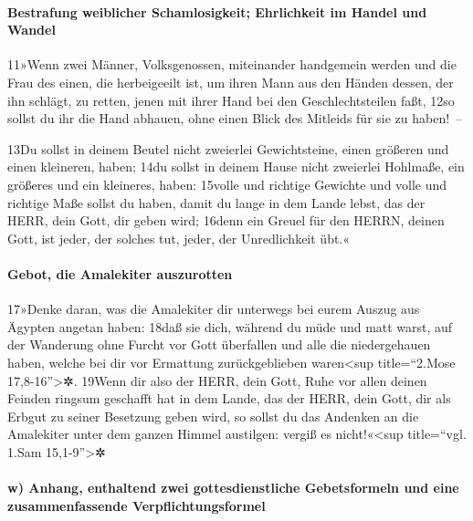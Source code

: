 \hypertarget{bestrafung-weiblicher-schamlosigkeit-ehrlichkeit-im-handel-und-wandel}{%
\paragraph{Bestrafung weiblicher Schamlosigkeit; Ehrlichkeit im Handel
und
Wandel}\label{bestrafung-weiblicher-schamlosigkeit-ehrlichkeit-im-handel-und-wandel}}

11»Wenn zwei Männer, Volksgenossen, miteinander handgemein werden und
die Frau des einen, die herbeigeeilt ist, um ihren Mann aus den Händen
dessen, der ihn schlägt, zu retten, jenen mit ihrer Hand bei den
Geschlechtsteilen faßt, 12so sollst du ihr die Hand abhauen, ohne einen
Blick des Mitleids für sie zu haben!~--

13Du sollst in deinem Beutel nicht zweierlei Gewichtsteine, einen
größeren und einen kleineren, haben; 14du sollst in deinem Hause nicht
zweierlei Hohlmaße, ein größeres und ein kleineres, haben: 15volle und
richtige Gewichte und volle und richtige Maße sollst du haben, damit du
lange in dem Lande lebst, das der HERR, dein Gott, dir geben wird;
16denn ein Greuel für den HERRN, deinen Gott, ist jeder, der solches
tut, jeder, der Unredlichkeit übt.«

\hypertarget{gebot-die-amalekiter-auszurotten}{%
\paragraph{Gebot, die Amalekiter
auszurotten}\label{gebot-die-amalekiter-auszurotten}}

17»Denke daran, was die Amalekiter dir unterwegs bei eurem Auszug aus
Ägypten angetan haben: 18daß sie dich, während du müde und matt warst,
auf der Wanderung ohne Furcht vor Gott überfallen und alle die
niedergehauen haben, welche bei dir vor Ermattung zurückgeblieben
waren\textless sup title=``2.Mose 17,8-16''\textgreater✲. 19Wenn dir
also der HERR, dein Gott, Ruhe vor allen deinen Feinden ringsum
geschafft hat in dem Lande, das der HERR, dein Gott, dir als Erbgut zu
seiner Besetzung geben wird, so sollst du das Andenken an die Amalekiter
unter dem ganzen Himmel austilgen: vergiß es nicht!«\textless sup
title=``vgl. 1.Sam 15,1-9''\textgreater✲

\hypertarget{w-anhang-enthaltend-zwei-gottesdienstliche-gebetsformeln-und-eine-zusammenfassende-verpflichtungsformel}{%
\paragraph{w) Anhang, enthaltend zwei gottesdienstliche Gebetsformeln
und eine zusammenfassende
Verpflichtungsformel}\label{w-anhang-enthaltend-zwei-gottesdienstliche-gebetsformeln-und-eine-zusammenfassende-verpflichtungsformel}}

